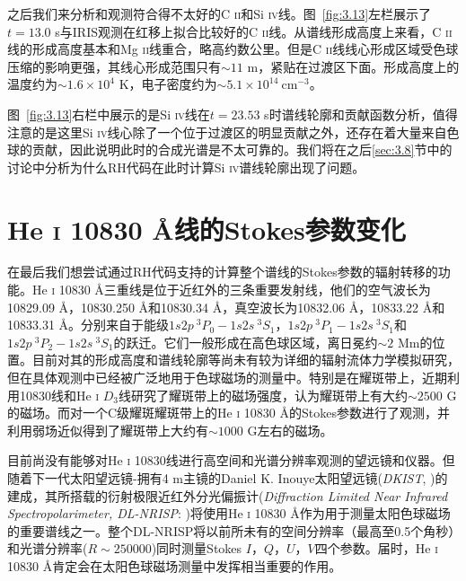 之后我们来分析和观测符合得不太好的C \textsc{ii}和Si \textsc{iv}线。图~\ref{fig:3.13}左栏展示了$t=13.0$ s与IRIS观测在红移上拟合比较好的C \textsc{ii}线。从谱线形成高度上来看，C \textsc{ii}线的形成高度基本和Mg \textsc{ii}线重合，略高约数公里。但是C \textsc{ii}线线心形成区域受色球压缩的影响更强，其线心形成范围只有$\sim 11$ m，紧贴在过渡区下面。形成高度上的温度约为$\sim1.6\times10^4$ K，电子密度约为$\sim 5.1 \times 10^{14}\ \mathrm{cm^{-3}}$。

图~\ref{fig:3.13}右栏中展示的是Si \textsc{iv}线在$t=23.53$ s时谱线轮廓和贡献函数分析，值得注意的是这里Si \textsc{iv}线心除了一个位于过渡区的明显贡献之外，还存在着大量来自色球的贡献，因此说明此时的合成光谱是不太可靠的。我们将在之后\ref{sec:3.8}节中的讨论中分析为什么RH代码在此时计算Si \textsc{iv}谱线轮廓出现了问题。
\section{He \textsc{i} 10830 \mbox{\AA}线的Stokes参数变化}
在最后我们想尝试通过RH代码支持的计算整个谱线的Stokes参数的辐射转移的功能。He \textsc{i} 10830 \mbox{\AA}三重线是位于近红外的三条重要发射线，他们的空气波长为10829.09 \mbox{\AA}，10830.250 \mbox{\AA}和10830.34 \mbox{\AA}，真空波长为10832.06 \mbox{\AA}，10833.22 \mbox{\AA}和10833.31 \mbox{\AA}。分别来自于能级$1s2p\ ^3P_0-1s2s\ ^3S_1$，$1s2p\ ^3P_1-1s2s\ ^3S_1$和$1s2p\ ^3P_2-1s2s\ ^3S_1$的跃迁。它们一般形成在高色球区域，离日冕约$\sim 2$ Mm的位置\parencites{Avrett1994,Chaouche2012}。目前对其的形成高度和谱线轮廓等尚未有较为详细的辐射流体力学模拟研究，但在具体观测中已经被广泛地用于色球磁场的测量中。特别是在耀斑带上，近期\textcites{Libbrecht2019}利用10830线和He \textsc{i} $D_3$线研究了耀斑带上的磁场强度，认为耀斑带上有大约$\sim 2500$ G的磁场。而\textcites{Anan2018}对一个C级耀斑耀斑带上的He \textsc{i} 10830 \mbox{\AA}的Stokes参数进行了观测，并利用弱场近似得到了耀斑带上大约有$\sim 1000$ G左右的磁场。

目前尚没有能够对He \textsc{i} 10830线进行高空间和光谱分辨率观测的望远镜和仪器。但随着下一代太阳望远镜-拥有4 m主镜的Daniel K. Inouye太阳望远镜(\textit{DKIST}, \cites{DKIST2014})的建成，其所搭载的衍射极限近红外分光偏振计(\textit{Diffraction Limited Near Infrared Spectropolarimeter, DL-NRISP}: \cites{DKIST2007})将使用He \textsc{i} 10830 \mbox{\AA}作为用于测量太阳色球磁场的重要谱线之一。整个DL-NRISP将以前所未有的空间分辨率（最高至0.5个角秒）和光谱分辨率($R\sim 250000$)同时测量Stokes $I$，$Q$，$U$，$V$四个参数。届时，He \textsc{i} 10830 \mbox{\AA}肯定会在太阳色球磁场测量中发挥相当重要的作用。

